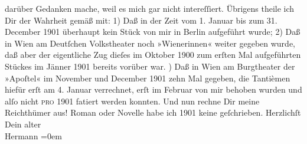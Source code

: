 \begin{ledgroupsized}[t]{13cm}
               darüber Gedanken mache, weil es mich gar nicht intereſſiert.\pend
           \pstart
           Übrigens theile ich Dir der Wahrheit gemäß mit: 1) Daß in der Zeit vom 1. Januar bis
               zum 31. December 1901 überhaupt kein Stück von mir in Berlin aufgeführt wurde; {\pb}2) Daß in Wien am Deutſchen
                  Volkstheater noch »Wienerinnen« weiter
               gegeben wurde, daß aber der eigentliche Zug dieſes im Oktober 1900 zum erſten Mal
               aufgeführten Stückes im Jänner 1901 bereits vorüber war.\pend
           ) Daß in Wien am Burgtheater der »Apoſtel« im November
               und December 1901 zehn Mal gegeben, die {\pb}Tantièmen
               hiefür erſt am 4. Januar verrechnet, erſt im Februar von mir behoben wurden und alſo
               nicht \textsc{pro} 1901 fatiert werden konnten. Und nun rechne Dir
               meine Reichthümer aus! Roman oder Novelle habe ich 1901 keine geſchrieben.\pend
           \pstart
           Herzlichſt{\\[\baselineskip]}Dein alter{\\[\baselineskip]}\spacefill\mbox{Hermann}\pend
           \leftskip=0em{}
         
         \endnumbering{}\end{ledgroupsized}  \newcommand{\dateiname}{L01230}\newcommand{\titel}{Hermann Bahr an Arthur Schnitzler, 10. 7. [1902]}\newcommand{\editorInnen}{ Kurt Ifkovits,  Martin Anton Müller}
      